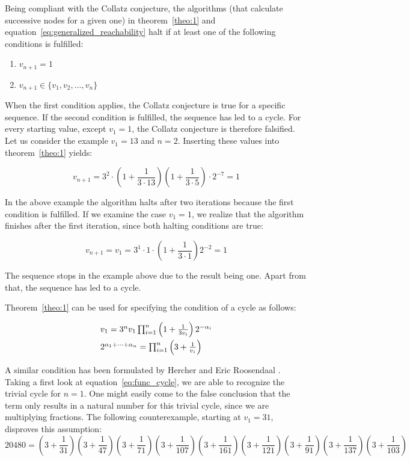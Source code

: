 \begin{definition}
	\label{def:halting_conditions}
	Being compliant with the Collatz conjecture, the algorithms (that calculate successive nodes for a given one) in theorem~\ref{theo:1} and equation~\ref{eq:generalized_reachability} halt if at least one of the following conditions is fulfilled:
	\begin{enumerate}
		\item $v_{n+1}=1$
		\item $v_{n+1}\in\{v_1,v_2,\ldots,v_n\}$
	\end{enumerate}
	When the first condition applies, the Collatz conjecture is true for a specific sequence. If the second condition is fulfilled, the sequence has led to a cycle. For every starting value, except $v_1=1$, the Collatz conjecture is therefore falsified. Let us consider the example $v_1=13$ and $n=2$. Inserting these values into theorem~\ref{theo:1} yields:
	
	\[
	v_{n+1}=3^2\cdot\left(1+\frac{1}{3\cdot13}\right)\left(1+\frac{1}{3\cdot5}\right)\cdot2^{-7}=1
	\]
	
	In the above example the algorithm halts after two iterations because the first condition is fulfilled. If we examine the case $v_1=1$, we realize that the algorithm finishes after the first iteration, since both halting conditions are true:
	
	\[
	v_{n+1}=v_1=3^1\cdot1\cdot\left(1+\frac{1}{3\cdot1}\right)2^{-2}=1
	\]
	
	The sequence stops in the example above due to the result being one. Apart from that, the sequence has led to a cycle.
\end{definition}

\noindent
Theorem~\ref{theo:1} can be used for specifying the condition of a cycle as follows:

\begin{equation}
\label{eq:func_cycle}
\begin{array}{l}
v_{1}=3^nv_1\prod_{i=1}^{n}\left(1+\frac{1}{3v_i}\right)2^{-\alpha_i}
\\[\medskipamount]
2^{\alpha_1+\cdots+\alpha_n}=\prod_{i=1}^{n}\left(3+\frac{1}{v_i}\right)
\end{array}
\end{equation}

A similar condition has been formulated by Hercher \cite{Ref_Hercher} and Eric Roosendaal \cite{Ref_Roosendaal_2020}. Taking a first look at equation~\ref{eq:func_cycle}, we are able to recognize the trivial cycle for $n=1$. One might easily come to the false conclusion that the term only results in a natural number for this trivial cycle, since we are multiplying fractions. The following counterexample, starting at $v_1=31$, disproves this assumption:
\begin{equation*}
20480=\left(3+\frac{1}{31}\right)\left(3+\frac{1}{47}\right)
\left(3+\frac{1}{71}\right)\left(3+\frac{1}{107}\right)\left(3+\frac{1}{161}\right)\left(3+\frac{1}{121}\right)\left(3+\frac{1}{91}\right)\left(3+\frac{1}{137}\right)\left(3+\frac{1}{103}\right)
\end{equation*}

